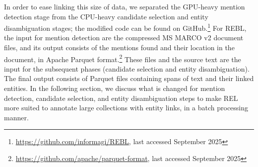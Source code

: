 In order to ease linking this size of data, we separated the GPU-heavy mention detection stage from the CPU-heavy candidate selection and entity disambiguation stages; the modified code can be found on GitHub.\footnote{\url{https://github.com/informagi/REBL}, last accessed September 2025}
For REBL, the input for mention detection are the compressed MS MARCO v2 document files, and its output consists of the mentions found and their location in the document, in Apache Parquet format.\footnote{\url{https://github.com/apache/parquet-format}, last accessed September 2025}
These files and the source text are the input for the subsequent phases (candidate selection and entity disambiguation). The final output consists of Parquet files containing spans of text and their linked entities. 
In the following section, we discuss what is changed for mention detection, candidate selection, and entity disambiguation steps to make REL more suited to annotate large collections with entity links, in a batch processing manner.  

